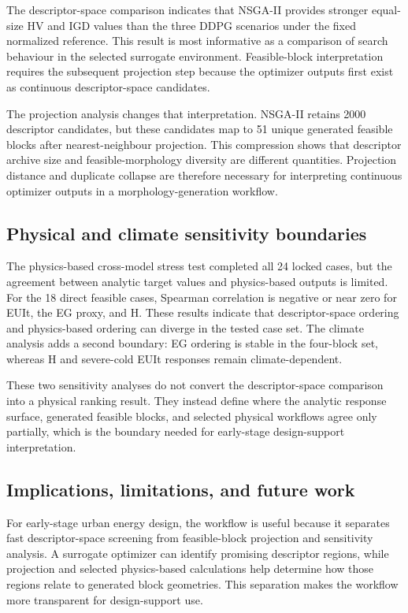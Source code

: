 \documentclass[final,3p,times,numbers,sort&compress]{elsarticle}
\def\textcolor#1#2{#2}%
\def\rev#1{#1}%
\newif\ifshowrevision
\newcommand{\rev}[1]{%
  \ifshowrevision{\textcolor{revisionblue}{#1}}\else#1\fi%
}
\begin{document}
\rev{The descriptor-space comparison indicates that NSGA-II provides stronger equal-size HV and IGD values than the three DDPG scenarios under the fixed normalized reference. This result is most informative as a comparison of search behaviour in the selected surrogate environment. Feasible-block interpretation requires the subsequent projection step because the optimizer outputs first exist as continuous descriptor-space candidates.}

\rev{The projection analysis changes that interpretation. NSGA-II retains 2000 descriptor candidates, but these candidates map to 51 unique generated feasible blocks after nearest-neighbour projection. This compression shows that descriptor archive size and feasible-morphology diversity are different quantities. Projection distance and duplicate collapse are therefore necessary for interpreting continuous optimizer outputs in a morphology-generation workflow.}

\subsection{Physical and climate sensitivity boundaries}

\rev{The physics-based cross-model stress test completed all 24 locked cases, but the agreement between analytic target values and physics-based outputs is limited. For the 18 direct feasible cases, Spearman correlation is negative or near zero for EUIt, the EG proxy, and H. These results indicate that descriptor-space ordering and physics-based ordering can diverge in the tested case set. The climate analysis adds a second boundary: EG ordering is stable in the four-block set, whereas H and severe-cold EUIt responses remain climate-dependent.}

\rev{These two sensitivity analyses do not convert the descriptor-space comparison into a physical ranking result. They instead define where the analytic response surface, generated feasible blocks, and selected physical workflows agree only partially, which is the boundary needed for early-stage design-support interpretation.}

\subsection{Implications, limitations, and future work}

For early-stage urban energy design, the workflow is useful because it separates fast descriptor-space screening from feasible-block projection and sensitivity analysis. A surrogate optimizer can identify promising descriptor regions, while projection and selected physics-based calculations help determine how those regions relate to generated block geometries. This separation makes the workflow more transparent for design-support use.
\end{document}
